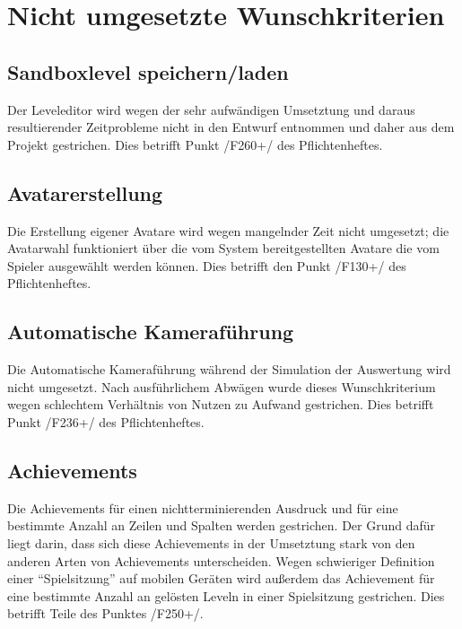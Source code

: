 \chapter{Nicht umgesetzte Wunschkriterien}

\section{Sandboxlevel speichern/laden}
	Der Leveleditor wird wegen der sehr aufwändigen Umsetztung und daraus resultierender Zeitprobleme 
nicht in den Entwurf entnommen und daher aus dem Projekt gestrichen. Dies betrifft Punkt /F260+/ des Pflichtenheftes.  
 
\section{Avatarerstellung}
Die Erstellung eigener Avatare wird wegen mangelnder Zeit nicht umgesetzt; die Avatarwahl funktioniert 
über die vom System bereitgestellten Avatare die vom Spieler ausgewählt werden können. Dies betrifft 
den Punkt /F130+/ des Pflichtenheftes.  

\section{Automatische Kameraführung}
Die Automatische Kameraführung während der Simulation der Auswertung wird nicht umgesetzt. Nach 
ausführlichem Abwägen wurde dieses Wunschkriterium wegen schlechtem Verhältnis von Nutzen zu Aufwand 
gestrichen. Dies betrifft Punkt /F236+/ des Pflichtenheftes. 

\section{Achievements}
Die Achievements für einen nichtterminierenden Ausdruck und für eine bestimmte Anzahl an Zeilen und Spalten 
werden gestrichen. Der Grund dafür liegt darin, dass sich diese Achievements in der Umsetztung stark von den
anderen Arten von Achievements unterscheiden. Wegen schwieriger Definition einer ``Spielsitzung'' auf mobilen Geräten wird außerdem das Achievement für eine bestimmte Anzahl an gelösten Leveln in einer Spielsitzung gestrichen.
Dies betrifft Teile des Punktes /F250+/.  